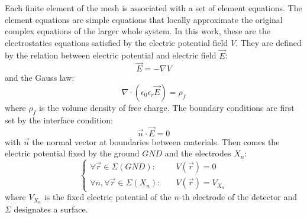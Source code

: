 Each finite element of the mesh is associated with a set of element equations. The element equations are simple equations that locally approximate the original complex equations of the larger whole system. In this work, these are the electrostatics equations satisfied by the electric potential field $V$. They are defined by the relation between electric potential and electric field $\vec{E}$:
\begin{equation}
\label{eq:potential-definition}
\vec{E} = - \nabla V
\end{equation}
and the Gauss law:
\begin{equation}
\label{eq:gauss-law}
\nabla \cdot \left( \epsilon_0 \epsilon_r \vec{E} \right) = \rho_f
\end{equation}
where $\rho_f$ is the volume density of free charge. The boundary conditions are first set by the interface condition:
\begin{equation}
\vec{n} \cdot \vec{E} = 0
\end{equation}
with $\vec{n}$ the normal vector at boundaries between materials. Then comes the electric potential fixed by the ground $GND$ and the electrodes $X_n$:
\begin{equation}
\begin{cases}
\forall \vec{r} \in \Sigma (GND): & \quad V(\vec{r}) = 0 \\
\forall n, \forall \vec{r} \in \Sigma ( X_n ): & \quad V(\vec{r}) = V_{X_n}
\end{cases}
\end{equation}
where $V_{X_n}$ is the fixed electric potential of the $n$-th electrode of the detector and $\Sigma$ designates a surface.

